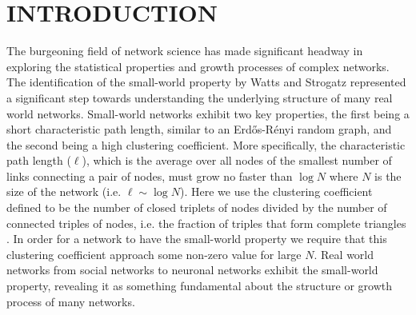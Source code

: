 \documentclass[aps,pre,reprint,superscriptaddress,amsmath,amssymb,nofootinbib]{revtex4-1}
\begin{document}

\maketitle

\section{INTRODUCTION}
The burgeoning field of network science has made significant headway in exploring the statistical properties and growth processes of complex networks.
The identification of the small-world property by Watts and Strogatz \cite{wsnat} represented a significant step towards understanding the underlying structure of many real world networks.
Small-world networks exhibit two key properties, the first being a short characteristic path length, similar to an Erd\H{o}s-R\'{e}nyi random graph, and the second being a high clustering coefficient.
More specifically, the characteristic path length ($\ell$), which is the average over all nodes of the smallest number of links connecting a pair of nodes, must grow no faster than $\log N$ where $N$ is the size of the network (i.e. $\ell \sim \log N$).
Here we use the clustering coefficient defined to be the number of closed triplets of nodes divided by the number of connected triples of nodes, i.e. the fraction of triples that form complete triangles \cite{newmanrandom}.
In order for a network to have the small-world property we require that this clustering coefficient approach some non-zero value for large $N$.
Real world networks from social networks to neuronal networks exhibit the small-world property, revealing it as something fundamental about the structure or growth process of many networks.
\end{document}
